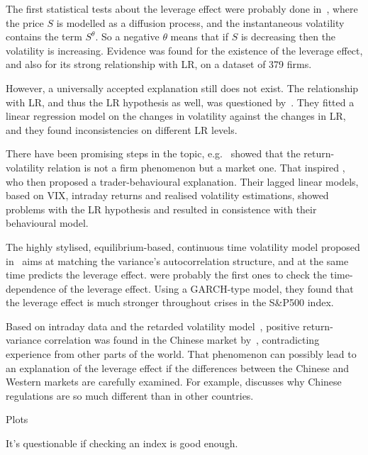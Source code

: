 The first statistical tests about the leverage effect were probably done in~\citet{Christie1982}, where the price $S$ is modelled as a diffusion process, and the instantaneous volatility contains the term $S^\theta$.
So a negative $\theta$ means that if $S$ is decreasing then the volatility is increasing.
Evidence was found for the existence of the leverage effect, and also for its strong relationship with LR, on a dataset of 379 firms.

However, a universally accepted explanation still does not exist.
The relationship with LR, and thus the LR hypothesis as well, was questioned by~\citet{figlewski2000leverage}.
They fitted a linear regression model on the changes in volatility against the changes in LR, and they found inconsistencies on different LR levels.

There have been promising steps in the topic, e.g.~\citet{dennis2006stock} showed that the return-volatility relation is not a firm phenomenon but a market one.
That inspired \citet{Hibbert2008}, who then proposed a trader-behavioural explanation.
Their lagged linear models, based on VIX, intraday returns and realised volatility estimations, showed problems with the LR hypothesis and resulted in consistence with their behavioural model.

The highly stylised, equilibrium-based, continuous time volatility model proposed in~\citet{bollerslev2011volatility} aims at matching the variance's autocorrelation structure, and at the same time predicts the leverage effect.
\citet{christensen2015impact} were probably the first ones to check the time-dependence of the leverage effect.
Using a GARCH-type model, they found that the leverage effect is much stronger throughout crises in the S\&P500 index.

Based on intraday data and the retarded volatility model~\citep{Bouchaud2001}, positive return-variance correlation was found in the Chinese market by~\citet{Shen2009}, contradicting experience from other parts of the world.
That phenomenon can possibly lead to an explanation of the leverage effect if the differences between the Chinese and Western markets are carefully examined.
For example, \citet{GORDON2003} discusses why Chinese regulations are so much different than in other countries.



Plots

It's questionable if checking an index is good enough.

